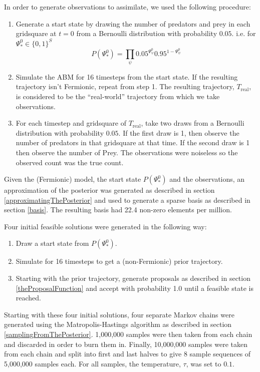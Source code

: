 \documentclass{article}
\begin{document}
In order to generate observations to assimilate, we used the following procedure:
\begin{enumerate}
\item Generate a start state by drawing the number of predators and prey in each gridsquare at $t=0$ from a Bernoulli distribution with probability $0.05$. i.e. for $\Psi^0_* \in \{0,1\}^S$
\begin{equation}
P(\Psi^0_*) = \prod_\psi 0.05^{\Psi^0_\psi}0.95^{1-\Psi^0_\psi}
\label{bernoulliStartState}
\end{equation}

\item Simulate the ABM for 16 timesteps from the start state. If the resulting trajectory isn't Fermionic, repeat from step 1. The resulting trajectory, $T_{\text{real}}$, is considered to be the ``real-world'' trajectory from which we take observations.

\item For each timestep and gridsquare of $T_{\text{real}}$, take two draws from a Bernoulli distribution with probability $0.05$. If the first draw is 1, then observe the number of predators in that gridsquare at that time. If the second draw is 1 then observe the number of Prey. The observations were noiseless so the observed count was the true count.
\end{enumerate}

Given the (Fermionic) model, the start state $P(\Psi^0_*)$ and the observations, an approximation of the posterior was generated as described in section \ref{approximatingThePosterior} and used to generate a sparse basis as described in section \ref{basis}. The resulting basis had 22.4 non-zero elements per million.

Four initial feasible solutions were generated in the following way:
\begin{enumerate}
\item Draw a start state from $P(\Psi^0_*)$.
\item Simulate for 16 timesteps to get a (non-Fermionic) prior trajectory.
\item Starting with the prior trajectory, generate proposals as described in section \ref{theProposalFunction} and accept with probability 1.0 until a feasible state is reached.
\end{enumerate}

Starting with these four initial solutions, four separate Markov chains were generated using the Matropolis-Hastings algorithm as described in section \ref{samplingFromThePosterior}. 1,000,000 samples were then taken from each chain and discarded in order to burn them in. Finally, 10,000,000 samples were taken from each chain and split into first and last halves to give 8 sample sequences of 5,000,000 samples each. For all samples, the temperature, $\tau$, was set to $0.1$.
\end{document}

